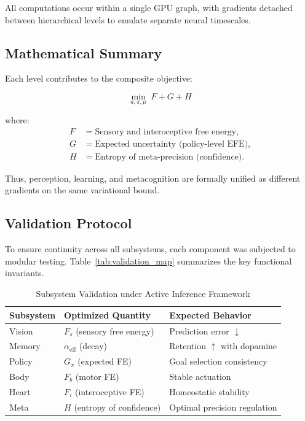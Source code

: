 \documentclass[9pt]{elife}
\begin{document}
All computations occur within a single GPU graph, with gradients detached
between hierarchical levels to emulate separate neural timescales.

\subsection{Mathematical Summary}

Each level contributes to the composite objective:

\[
\min_{a,\pi,\mu} \; F + G + H
\]

where:
\[
\begin{aligned}
F &\;=\; \text{Sensory and interoceptive free energy,} \\
G &\;=\; \text{Expected uncertainty (policy-level EFE),} \\
H &\;=\; \text{Entropy of meta-precision (confidence).}
\end{aligned}
\]

Thus, perception, learning, and metacognition are formally unified as
different gradients on the same variational bound.

\subsection{Validation Protocol}

To ensure continuity across all subsystems,
each component was subjected to modular testing.
Table~\ref{tab:validation_map} summarizes the key functional invariants.

\begin{table}[h]
\centering
\caption{Subsystem Validation under Active Inference Framework}
\begin{tabular}{l l l}
\hline
Subsystem & Optimized Quantity & Expected Behavior \\
\hline
Vision & $F_s$ (sensory free energy) & Prediction error $\downarrow$ \\
Memory & $\alpha_{\mathrm{eff}}$ (decay) & Retention $\uparrow$ with dopamine \\
Policy & $G_\pi$ (expected FE) & Goal selection consistency \\
Body & $F_b$ (motor FE) & Stable actuation \\
Heart & $F_i$ (interoceptive FE) & Homeostatic stability \\
Meta & $H$ (entropy of confidence) & Optimal precision regulation \\
\hline
\end{tabular}
\end{table}
\end{document}
